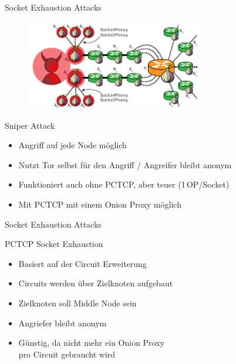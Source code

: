 \documentclass{beamer}
\begin{document}
\begin{frame}{Socket Exhaustion Attacks}{\secname}
  \begin{figure}[h]
    \begin{center}
      \includegraphics[width=0.7\textwidth]{pics/sniper}
    \end{center}
  \end{figure} 
  \begin{block}{Sniper Attack}
    \begin{itemize}
      \item Angriff auf jede Node möglich
      \item Nutzt Tor selbst für den Angriff / Angreifer bleibt anonym
      \item Funktioniert auch ohne PCTCP, aber teuer (1\,OP/Socket)
      \item Mit PCTCP mit einem Onion Proxy möglich
    \end{itemize}
  \end{block}
\end{frame}


\begin{frame}{Socket Exhaustion Attacks}{\secname}
  \begin{block}{PCTCP Socket Exhaustion}
    \begin{itemize}
      \item Basiert auf der Circuit Erweiterung
      \item Circuits werden über Zielknoten aufgebaut
      \item Zielknoten soll Middle Node sein
      \item Angriefer bleibt anonym
      \item Günstig, da nicht mehr ein Onion Proxy\\pro Circuit gebraucht wird
    \end{itemize}
  \end{block}
\end{frame}

\end{document}
